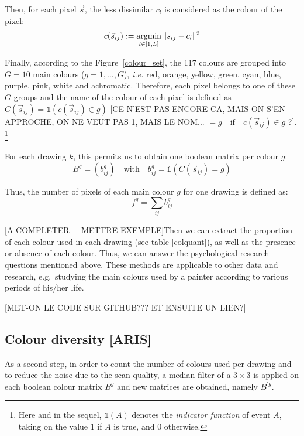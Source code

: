 \documentclass[11pt,a4paper]{article}
\begin{document}
Then, for each pixel \(\vec{s}\), the less dissimilar \(c_l\) is considered as
the colour of the pixel:
\begin{equation*}
c(\vec{s}_{ij}) := \operatornamewithlimits{argmin}_{l \in [1,L]} \| s_{ij} - c_{l} \|^{2}
\end{equation*}

Finally, according to the Figure~\ref{colour_set}, the 117 colours are grouped into $G = 10$
main colours ($g = 1, \dots, G$), \textit{i.e.} red, orange, yellow, green, cyan, blue, purple, pink,
white and achromatic. Therefore, each pixel belongs to one of these
$G$ groups and the name of the colour of each pixel is defined as $C(\vec{s}_{ij}) = \mathds{1}(c(\vec{s}_{ij}) \in g)$ [CE N'EST PAS ENCORE CA, MAIS ON S'EN APPROCHE, ON NE VEUT PAS 1, MAIS LE NOM... $= g \quad \textrm{if} \quad c(\vec{s}_{ij}) \in g$ ?]. \footnote{Here and in the sequel, $\mathds{1}(A)$ denotes the \textit{indicator function} of event $A$, taking on the value 1 if $A$ is true, and 0 otherwise.}

For each drawing $k$, this permits us to obtain one
boolean matrix per colour $g$:
\begin{equation}
B^{g} = (b_{ij}^{g}) \quad \textrm{with} \quad b_{ij}^{g} =  \mathds{1}(C(\vec{s}_{ij}) = g)
\end{equation}

Thus, the number of pixels of each main colour $g$ for one drawing is defined as:
\begin{equation}
	f^{g} = \sum_{ij}b_{ij}^{g}
\end{equation}




{[}A COMPLETER + METTRE EXEMPLE{]}Then we can extract the proportion of
each colour used in each drawing (see table \ref{colquant}), as well as
the presence or absence of each colour. Thus, we can answer the
psychological research questions mentioned above. These methods are
applicable to other data and research, e.g.~studying the main colours
used by a painter according to various periods of his/her life.





[MET-ON LE CODE SUR GITHUB??? ET ENSUITE UN LIEN?]


\subsection{Colour diversity [ARIS]}
\label{sec:diversity}

As a second step, in order to
count the number of colours used per drawing and to reduce the noise due
to the scan quality, a median filter of a \(3 \times 3\) is applied on
each boolean colour matrix $B^{g}$ and new matrices are obtained, namely
$B^{\prime g}$.
\end{document}
